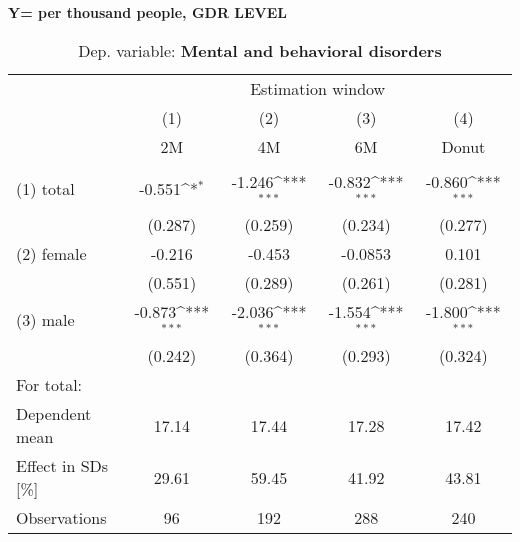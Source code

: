 \documentclass[11pt, a4paper]{article} %
\begin{document}
\newpage
\textbf{Y= per thousand people, GDR LEVEL}
 \begin{table}[htbp] \centering 
 \begin{threeparttable} \centering 
 \caption{Dep. variable: \textbf{Mental and behavioral disorders}} 
 {\def\sym#1{\ifmmode^{#1}\else\(^{#1}\)\fi} 
 \begin{tabular}{l*{4}{c}} \toprule & \multicolumn{4}{c}{Estimation window} \\ \cmidrule(lr){2-5}
	&\multicolumn{1}{c}{(1)}&\multicolumn{1}{c}{(2)}&\multicolumn{1}{c}{(3)}&\multicolumn{1}{c}{(4)}\\
    &\multicolumn{1}{c}{2M}&\multicolumn{1}{c}{4M}&\multicolumn{1}{c}{6M}&\multicolumn{1}{c}{Donut}\\
	\midrule
\\
(1) total	& -0.551\sym{*} 	&  -1.246\sym{***} & 	-0.832\sym{***}  & 	-0.860\sym{***} \\
			& (0.287) 	&  (0.259) 	 &	(0.234) 	& (0.277) \\
(2) female	& -0.216 	&  -0.453	 &	-0.0853 	& 0.101 \\
			& (0.551) 	&  (0.289) 	 &	(0.261)	 	& (0.281) \\
(3) male 	& -0.873\sym{***}	&  -2.036\sym{***} & 	-1.554\sym{***} & 	-1.800\sym{***} \\
 		 	& (0.242) 	&  (0.364) 	 &	(0.293) 	& (0.324) \\
\midrule
For total: \\ 
Dependent mean &    17.14 & 17.44 & 17.28 & 17.42 \\  
Effect in SDs [\%]  &  29.61 & 59.45 &  41.92 & 43.81 \\ 
Observations & 96 & 192 & 288 & 240 \\  
\bottomrule
\end{tabular}}
\end{threeparttable} \end{table} 
\end{document}
